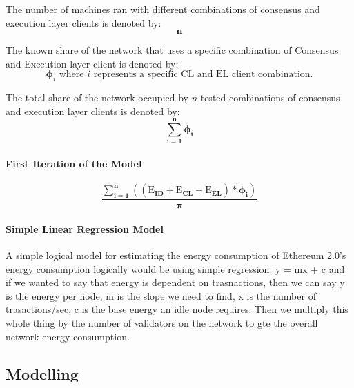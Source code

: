 The number of machines ran with different combinations of consensus and execution layer clients is denoted by:
\begin{equation*}
    \boldsymbol{n}
\end{equation*}

The known share of the network that uses a specific combination of Consensus and Execution layer client is denoted by:
\begin{equation*}
    \boldsymbol{\phi}_{i} \text{ where } {i} \text{ represents a specific CL and EL client combination.}
\end{equation*}

The total share of the network occupied by ${n}$ tested combinations of consensus and execution layer clients is denoted by:
\begin{equation*}
    \boldsymbol{\displaystyle\sum\limits_{i=1}^{n}{\phi_{i}}}
\end{equation*}

\paragraph{First Iteration of the Model}

\begin{equation}
\boldsymbol{\frac{\displaystyle\sum\limits_{i=1}^{n}{ \left({\left(\mathrm{\overline{E}}_{ID} + \mathrm{\overline{E}}_{CL} + \mathrm{\overline{E}}_{EL}\right)} * {\phi_{i}} \right)}}
 {\pi}}
\end{equation}

\paragraph{ Simple Linear Regression Model}
A simple logical model for estimating the energy consumption of Ethereum 2.0's energy consumption logically would be using simple regression. y = mx + c and if we wanted to say that energy is dependent on trasnactions, then we can say y is the energy per node, m is the slope we need to find, x is the number of trasactions/sec, c is the base energy an idle node requires. Then we multiply this whole thing by the number of validators on the network to gte the overall network energy consumption.



\subsection {Modelling }
